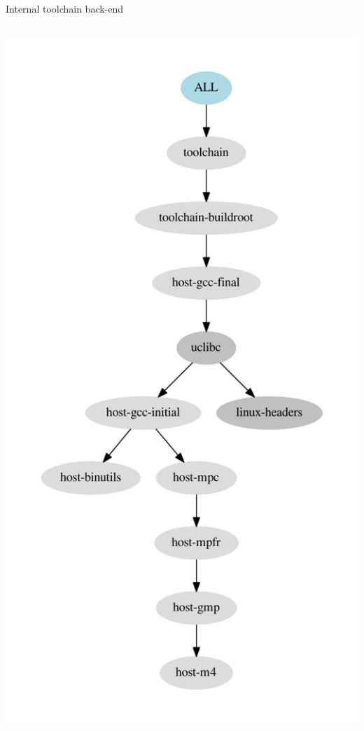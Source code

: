 \begin{frame}{Internal toolchain back-end}
\begin{columns}
  \includegraphics[width=\textwidth]{slides/buildroot-internals/internal-toolchain-graph-depends.pdf}
\end{columns}

\end{frame}

